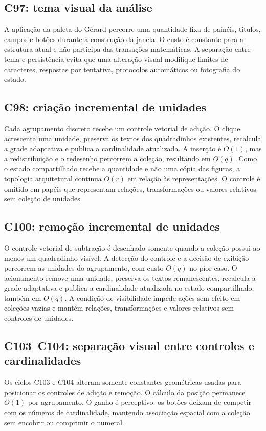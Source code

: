 \documentclass[12pt,a4paper]{article}
\begin{document}
\subsection{C97: tema visual da análise}
A aplicação da paleta do Gérard percorre uma quantidade fixa de painéis, títulos, campos e botões durante a construção da janela. O custo é constante para a estrutura atual e não participa das transações matemáticas. A separação entre tema e persistência evita que uma alteração visual modifique limites de caracteres, respostas por tentativa, protocolos automáticos ou fotografia do estado.

\subsection{C98: criação incremental de unidades}
Cada agrupamento discreto recebe um controle vetorial de adição. O clique acrescenta uma unidade, preserva os textos dos quadradinhos existentes, recalcula a grade adaptativa e publica a cardinalidade atualizada. A inserção é $O(1)$, mas a redistribuição e o redesenho percorrem a coleção, resultando em $O(q)$. Como o estado compartilhado recebe a quantidade e não uma cópia das figuras, a topologia arquitetural continua $O(r)$ em relação às representações. O controle é omitido em papéis que representam relações, transformações ou valores relativos sem coleção de unidades.

\subsection{C100: remoção incremental de unidades}
O controle vetorial de subtração é desenhado somente quando a coleção possui ao menos um quadradinho visível. A detecção do controle e a decisão de exibição percorrem as unidades do agrupamento, com custo $O(q)$ no pior caso. O acionamento remove uma unidade, preserva os textos remanescentes, recalcula a grade adaptativa e publica a cardinalidade atualizada no estado compartilhado, também em $O(q)$. A condição de visibilidade impede ações sem efeito em coleções vazias e mantém relações, transformações e valores relativos sem controles de unidades.

\subsection{C103--C104: separação visual entre controles e cardinalidades}
Os ciclos C103 e C104 alteram somente constantes geométricas usadas para posicionar os controles de adição e remoção. O cálculo da posição permanece $O(1)$ por agrupamento. O ganho é perceptivo: os botões deixam de competir com os números de cardinalidade, mantendo associação espacial com a coleção sem encobrir ou comprimir o numeral.
\end{document}
